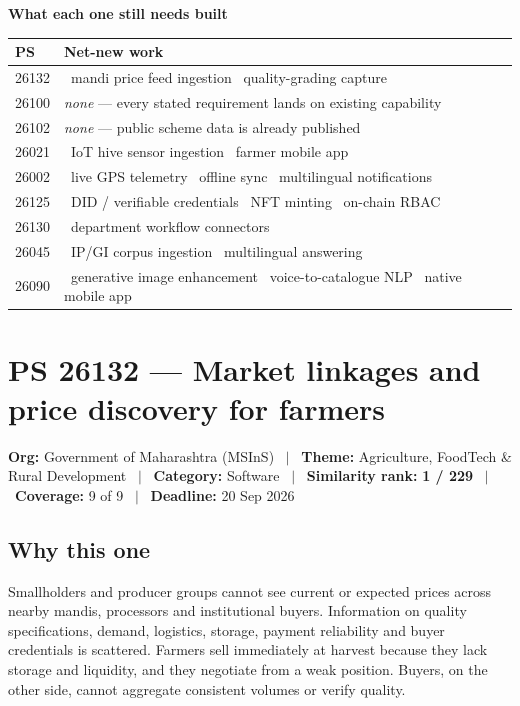 \documentclass[11pt]{article}
\newcommand{\bld}{{\color{gxamber}\ding{53}}}       %
\newcommand{\psbanner}[6]{%
  \vspace{0.2em}
  {\footnotesize\color{gxslate}\textbf{Org:} #1 \ $\vert$ \ \textbf{Theme:} #2 \ $\vert$ \ \textbf{Category:} #3 \ $\vert$ \ \textbf{Similarity rank:} #4 \ $\vert$ \ \textbf{Coverage:} #5 \ $\vert$ \ \textbf{Deadline:} #6}
  \par\vspace{0.6em}
}
\begin{document}
\vspace{1.2em}
\noindent\textbf{What each one still needs built}

\vspace{0.3em}
\renewcommand{\arraystretch}{1.35}
\noindent\begin{tabular}{@{}m{1.15cm}m{14.3cm}@{}}
\toprule
\textbf{PS} & \textbf{Net-new work} \\
\midrule
\rowcolor{gxteal!8}
26132 & \bld\ mandi price feed ingestion \quad \bld\ quality-grading capture \\
26100 & \emph{none} --- every stated requirement lands on existing capability \\
26102 & \emph{none} --- public scheme data is already published \\
26021 & \bld\ IoT hive sensor ingestion \quad \bld\ farmer mobile app \\
26002 & \bld\ live GPS telemetry \quad \bld\ offline sync \quad \bld\ multilingual notifications \\
26125 & \bld\ DID / verifiable credentials \quad \bld\ NFT minting \quad \bld\ on-chain RBAC \\
\rowcolor{gxcyan!7}
26130 & \bld\ department workflow connectors \\
\rowcolor{gxcyan!7}
26045 & \bld\ IP/GI corpus ingestion \quad \bld\ multilingual answering \\
26090 & \bld\ generative image enhancement \quad \bld\ voice-to-catalogue NLP \quad \bld\ native mobile app \\
\bottomrule
\end{tabular}

\clearpage
\section{PS 26132 --- Market linkages and price discovery for farmers}
\psbanner{Government of Maharashtra (MSInS)}{Agriculture, FoodTech \& Rural Development}{Software}{\textbf{1 / 229}}{9 of 9}{20 Sep 2026}

\subsection*{Why this one}
Smallholders and producer groups cannot see current or expected prices across nearby mandis, processors
and institutional buyers. Information on quality specifications, demand, logistics, storage, payment
reliability and buyer credentials is scattered. Farmers sell immediately at harvest because they lack
storage and liquidity, and they negotiate from a weak position. Buyers, on the other side, cannot
aggregate consistent volumes or verify quality.
\end{document}

